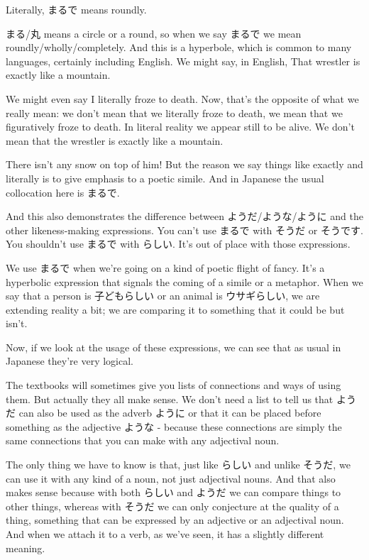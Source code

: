 Literally, まるで means roundly.

{}

まる/丸 means a circle or a round, so when we say まるで we mean roundly/wholly/completely. And this is a hyperbole, which is common to many languages, certainly including English. We might say, in English, That wrestler is exactly like a mountain.

We might even say I literally froze to death. Now, that's the opposite of what we really mean: we don't mean that we literally froze to death, we mean that we figuratively froze to death. In literal reality we appear still to be alive. We don't mean that the wrestler is exactly like a mountain.

There isn't any snow on top of him! But the reason we say things like exactly and literally is to give emphasis to a poetic simile. And in Japanese the usual collocation here is まるで.

And this also demonstrates the difference between ようだ/ような/ように and the other likeness-making expressions. You can't use まるで with そうだ or そうです. You shouldn't use まるで with らしい. It's out of place with those expressions.

We use まるで when we're going on a kind of poetic flight of fancy. It's a hyperbolic expression that signals the coming of a simile or a metaphor. When we say that a person is 子どもらしい or an animal is ウサギらしい, we are extending reality a bit; we are comparing it to something that it could be but isn't.

Now, if we look at the usage of these expressions, we can see that as usual in Japanese they're very logical.

{}

The textbooks will sometimes give you lists of connections and ways of using them. But actually they all make sense. We don't need a list to tell us that ようだ can also be used as the adverb ように or that it can be placed before something as the adjective ような - because these connections are simply the same connections that you can make with any adjectival noun.

The only thing we have to know is that, just like らしい and unlike そうだ, we can use it with any kind of a noun, not just adjectival nouns. And that also makes sense because with both らしい and ようだ we can compare things to other things, whereas with そうだ we can only conjecture at the quality of a thing, something that can be expressed by an adjective or an adjectival noun. And when we attach it to a verb, as we've seen, it has a slightly different meaning.

